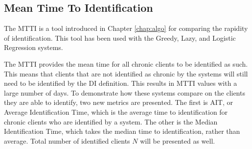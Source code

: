 \subsection{Mean Time To Identification}

The MTTI is a tool introduced in Chapter \ref{chap:algo} for comparing the rapidity of identification. This tool has been used with the Greedy, Lazy, and Logistic Regression systems.


The MTTI provides the mean time for all chronic clients to be identified as such. This means that clients that are not identified as chronic by the \Abb systems will still need to be identified by the DI definition. This results in MTTI values with a large number of days. To demonstrate how these systems compare on the clients they are able to identify, two new metrics are presented. The first is AIT, or Average Identification Time, which is the average time to identification for chronic clients who are identified by a system. The other is the Median Identification Time, which takes the median time to identification, rather than average. Total number of identified clients $N$ will be presented as well.

